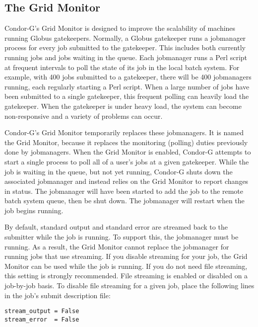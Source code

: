 \subsection{\label{sec:Condor-G-GridMonitor}The Grid Monitor}

Condor-G's Grid Monitor is designed to improve the scalability of
machines running Globus gatekeepers.
Normally, a Globus gatekeeper runs a jobmanager process for 
every job submitted to the gatekeeper.
This includes both currently running jobs and jobs waiting in the queue.
Each jobmanager runs a Perl script at
frequent intervals to poll the state of its job in the local batch system.
For example, with 400 jobs submitted to a gatekeeper,
there will be 400 jobmanagers running,
each regularly starting a Perl script.
When a large number of jobs
have been submitted to a single gatekeeper,
this frequent polling can heavily load the gatekeeper.
When the gatekeeper is under heavy load,
the system can become non-responsive and a variety of problems can occur.

Condor-G's Grid Monitor temporarily replaces these jobmanagers.
It is named the Grid Monitor, because it replaces the monitoring
(polling) duties previously done by jobmanagers.
When the Grid Monitor is enabled,
Condor-G attempts to start a single
process to poll all of a user's jobs at a given gatekeeper.
While the job is waiting in the queue, but not yet running,
Condor-G shuts down the associated jobmanager and instead
relies on the Grid Monitor to report changes in status.
The jobmanager will have been started to add the job to the remote
batch system queue, then be shut down.
The jobmanager will restart when the job begins running.

By default, standard output and standard error are streamed back
to the submitter while the job is running.
To support this, the jobmanager must be running.
As a result, the Grid Monitor cannot
replace the jobmanager for running jobs that use streaming.
If you disable streaming for your job,
the Grid Monitor can be used while the job is running.
If you do not need file streaming, this setting is strongly recommended.
File streaming is enabled or disabled on a job-by-job basis.
To disable file streaming for a given job, place the
following lines in the job's submit description file:

\begin{verbatim}
stream_output = False
stream_error  = False
\end{verbatim}

